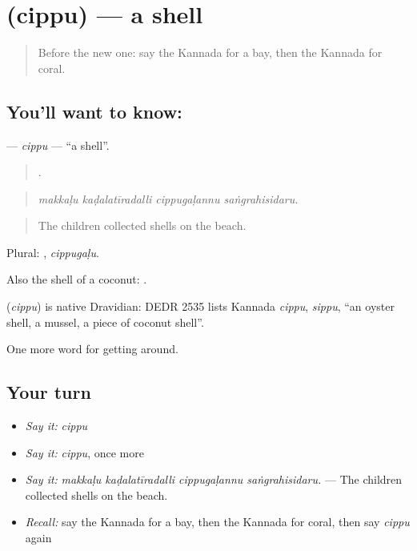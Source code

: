 \section[\texorpdfstring{\kn{ಚಿಪ್ಪು} (cippu)}{ಚಿಪ್ಪು (cippu)}]{ (cippu) — a shell}

\label{lesson:KA-C481-cippu}



\begin{quote}
Before the new one: say the Kannada for a bay, then the Kannada for coral.
\end{quote}

\subsection*{You'll want to know: }
\textbf{} — \emph{cippu} — \textquotedblleft{}a shell\textquotedblright{}.

\begin{quote}
   .
\end{quote}

\begin{quote}
\emph{makkaḷu kaḍalatīradalli cippugaḷannu saṅgrahisidaru.}
\end{quote}

\begin{quote}
The children collected shells on the beach.
\end{quote}

Plural: , \emph{cippugaḷu}.

Also the shell of a coconut:  .

\begin{cousinweb}
\textbf{} (\emph{cippu}) is native Dravidian: DEDR 2535 lists Kannada \emph{cippu}, \emph{sippu}, \textquotedblleft{}an oyster shell, a mussel, a piece of coconut shell\textquotedblright{}.
\end{cousinweb}

\begin{grammarlens}[title={What you've built}]
One more word for getting around.
\end{grammarlens}

\subsection*{Your turn}
\begin{itemize}
\raggedright
  \item \emph{Say it:} \emph{cippu}
  \item \emph{Say it:} \emph{cippu}, once more
  \item \emph{Say it:} \emph{makkaḷu kaḍalatīradalli cippugaḷannu saṅgrahisidaru.} — The children collected shells on the beach.
  \item \emph{Recall:} say the Kannada for a bay, then the Kannada for coral, then say \emph{cippu} again
\end{itemize}

